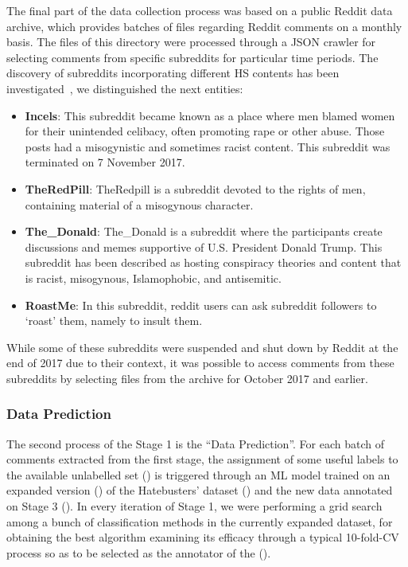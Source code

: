 \documentclass[sigconf]{acmart}
\begin{document}
The final part of the data collection process was based on a public Reddit data archive, which provides batches of files regarding Reddit comments on a monthly basis. The files of this directory were processed through a JSON crawler for selecting comments from specific subreddits for particular time periods. The discovery of subreddits incorporating different HS contents has been investigated~\cite{wikiIncels,wikiDonald}, we distinguished the next entities:
\begin{itemize}
    \item \textbf{Incels}: This subreddit became known as a place where men blamed women for their unintended celibacy, often promoting rape or other abuse. Those posts had a misogynistic and sometimes racist content. This subreddit was terminated on 7 November 2017.
    \item \textbf{TheRedPill}: TheRedpill is a subreddit devoted to the rights of men, containing material of a misogynous character.
    \item \textbf{The\_Donald}: The\_Donald is a subreddit where the participants create discussions and memes supportive of U.S. President Donald Trump. This subreddit has been described as hosting conspiracy theories and content that is racist, misogynous, Islamophobic, and antisemitic.
    \item \textbf{RoastMe}: In this subreddit, reddit users can ask subreddit followers to `roast' them, namely to insult them.
\end{itemize}

While some of these subreddits were suspended and shut down by Reddit at the end of 2017 due to their context, it was possible to access comments from these subreddits by selecting files from the archive for October 2017 and earlier.

\subsubsection{Data Prediction}
The second process of the Stage 1 is the ``Data Prediction''. For each batch of comments extracted from the first stage, the assignment of some useful labels to the available unlabelled set () is triggered through an ML model trained on an expanded version () of the Hatebusters' dataset () and the new data annotated on Stage 3 (). In every iteration of Stage 1, we were performing a grid search among a bunch of classification methods in the currently expanded dataset, for obtaining the best algorithm examining its efficacy through a typical 10-fold-CV process so as to be selected as the annotator of the ().
\end{document}
